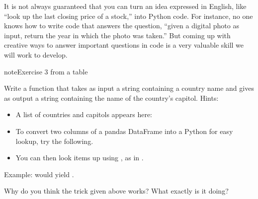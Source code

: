 \documentclass[letterpaper,10pt,english]{sphinxmanual}
\begin{document}
It is not always guaranteed that you can turn an idea expressed in English, like “look up the last closing price of a stock,” into Python code.  For instance, no one knows how to write code that answers the question, “given a digital photo as input, return the year in which the photo was taken.”  But coming up with creative ways to answer important questions in code is a very valuable skill we will work to develop.

\begin{sphinxadmonition}{note}{Exercise 3 \sphinxhyphen{} from a table}

Write a function  that takes as input a string containing a country name and gives as output a string containing the name of the country’s capitol.  Hints:
\begin{itemize}
\item {} 
A list of countries and capitols appears here: 

\item {} 
To convert two columns of a pandas DataFrame into a Python  for easy lookup, try the following.

\end{itemize}

\begin{sphinxVerbatim}[commandchars=\\\{\}]
    \PYG{p}{[}\PYG{p}{]} \PYG{p}{[}\PYG{p}{]}  
\end{sphinxVerbatim}
\begin{itemize}
\item {} 
You can then look items up using , as in .

\end{itemize}

Example:  would yield .
\end{sphinxadmonition}

Why do you think the  trick given above works?  What exactly is it doing?
\end{document}
